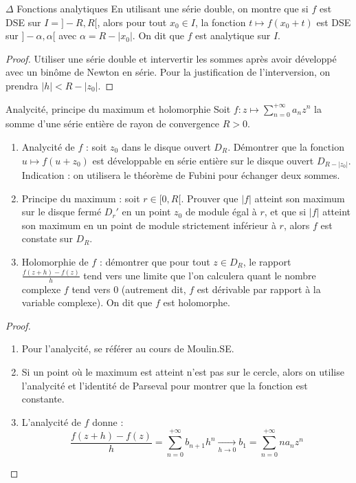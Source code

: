 \documentclass[french,a4paper]{article}
\theoremstyle{plain}
\theoremstyle{definition}
\theoremstyle{remark}
\begin{document}
\begin{ex}{$\Delta$ Fonctions analytiques} En utilisant une série double, on montre que si $f$ est DSE sur $I=]-R,R[$, alors pour tout $x_0\in I$, la fonction $t\mapsto f(x_0+t)$ est DSE sur $]-\alpha,\alpha[$ avec $\alpha=R-\lvert x_0\rvert$. On dit que $f$ est analytique sur $I$.
\end{ex}
\begin{proof}
	Utiliser une série double et intervertir les sommes après avoir développé avec un binôme de Newton en série. Pour la justification de l'interversion, on prendra $\lvert h\rvert<R-\lvert z_0\rvert$.
\end{proof}

\begin{ex}[Châteaux]{Analycité, principe du maximum et holomorphie}
	Soit $f:z\mapsto\displaystyle\sum_{n=0}^{+\infty}a_nz^n$ la somme d'une série entière de rayon de convergence $R>0$.
	\begin{enumerate}
		\item Analycité de $f$ : soit $z_0$ dans le disque ouvert $D_R$. Démontrer que la fonction $u\mapsto f(u+z_0)$ est développable en série entière sur le disque ouvert $D_{R-\lvert z_0\rvert}$. Indication : on utilisera le théorème de Fubini pour échanger deux sommes.
		\item Principe du maximum : soit $r\in[0,R[$. Prouver que $\lvert f\rvert$ atteint son maximum sur le disque fermé $D_r'$ en un point $z_0$ de module égal à $r$, et que si $\lvert f\rvert$ atteint son maximum en un point de module strictement inférieur à $r$, alors $f$ est constate sur $D_R$.
		\item Holomorphie de $f$ : démontrer que pour tout $z\in D_R$, le rapport $\displaystyle\frac{f(z+h)-f(z)}{h}$ tend vers une limite que l'on calculera quant le nombre complexe $f$ tend vers $0$ (autrement dit, $f$ est dérivable par rapport à la variable complexe). On dit que $f$ est holomorphe.
	\end{enumerate}
\end{ex}
\begin{proof}
	\begin{enumerate}
		\item Pour l'analycité, se référer au cours de Moulin.SE.
		\item Si un point où le maximum est atteint n'est pas sur le cercle, alors on utilise l'analycité et l'identité de Parseval pour montrer que la fonction est constante.
		\item L'analycité de $f$ donne : $$\frac{f(z+h)-f(z)}{h}=\sum_{n=0}^{+\infty}b_{n+1}h^n\xrightarrow[h\to 0]{}b_1=\sum_{n=0}^{+\infty}na_nz^n$$
	\end{enumerate}
\end{proof}
\end{document}
